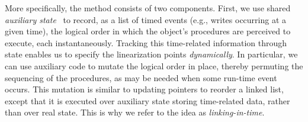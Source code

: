 
More specifically, the method consists of two
components. First, we use shared \emph{auxiliary
  state}~\cite{Owicki-Gries:CACM76} to record, as a list of timed
events (e.g., writes occurring at a given time), the logical order in which the object's procedures are
perceived to execute, each instantaneously. Tracking this time-related
information through state enables us to specify the linearization
points \emph{dynamically}. In particular, we can use auxiliary
  code to mutate the logical order in place, thereby permuting
the sequencing of the procedures, as may be needed when some run-time
event occurs. This mutation is similar to updating pointers
to reorder a linked list, except that it is executed over
auxiliary state storing time-related data, rather than over real
state. This is why we refer to the idea as \emph{linking-in-time}.


